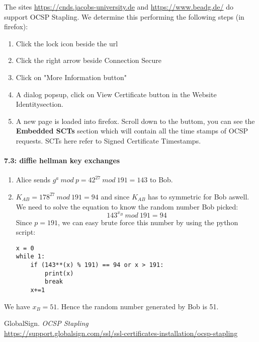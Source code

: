 \documentclass[a4paper]{article}
\begin{document}
\begin{enumerate}[label=(\alph*)]
        The sites \url{https://cnds.jacobs-university.de} and \url{https://www.beadg.de/} do support OCSP Stapling. We determine this performing the following steps (in firefox):
        \begin{enumerate}[label=(\alph*)]
            \item Click the lock icon beside the url
            \item Click the right arrow beside {\color{yellow} Connection Secure}
            \item Click on "More Information button"
            \item A dialog popsup, click on View Certificate button in the Website Identitysection.
            \item A new page is loaded into firefox. Scroll down to the buttom, you can see the \textbf{Embedded SCTs} section which will contain all the time stamps of OCSP requests. SCTs here refer to Signed Certificate Timestamps.
        \end{enumerate}
\end{enumerate}

\paragraph*{7.3: diffie hellman key exchanges}
\begin{enumerate}[label=(\alph*)]
    \item Alice sends $ g^{a}\ mod\ p = 42^{27}\ mod\ 191 = 143 $ to Bob.
    \item $K_{AB} = 178^{27}\ mod\ 191 = 94$ and since $K_{AB}$ has to symmetric for Bob aswell. We need to solve the equation to know the random number Bob picked:
        $$ 143^{x_B}\ mod\ 191 = 94$$
Since $p=191$, we can easy brute force this number by using the python script:
            \begin{verbatim}
x = 0
while 1:
    if (143**(x) % 191) == 94 or x > 191:
        print(x)
        break
    x+=1
            \end{verbatim}
\end{enumerate}
We have $x_{B} = 51$. Hence the random number generated by Bob is 51.


\begin{thebibliography}{9}
GlobalSign.
\textit{OCSP Stapling}\\
\url{https://support.globalsign.com/ssl/ssl-certificates-installation/ocsp-stapling}
\end{thebibliography}
\end{document}
